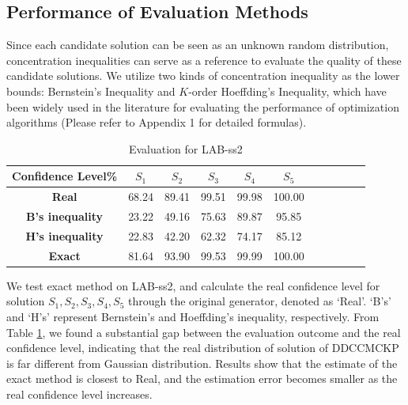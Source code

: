\documentclass[lettersize,journal]{IEEEtran}
\begin{document}
\subsection{Performance of Evaluation Methods}
Since each candidate solution can be seen as an unknown random distribution, concentration inequalities can serve as a reference to evaluate the quality of these candidate solutions. 
We utilize two kinds of concentration inequality as the lower bounds: Bernstein's Inequality and  $K$-order Hoeffding's Inequality, which have been widely used in the literature for evaluating the performance of optimization algorithms (Please refer to Appendix 1 for detailed formulas). 

\begin{table}[!t]
\caption{Evaluation for LAB-ss2}
\centering
\begin{tabular}{ccccccccccc}
\toprule
{\bfseries Confidence Level\%} & $S_1$ & $S_2$ & $S_3$ & $S_4$ & $S_5$\\
\midrule
{\bfseries Real} &68.24&89.41 &99.51 &99.98&100.00 \\
{\bfseries B's inequality} &23.22 &49.16 &75.63 &89.87 &95.85 \\
{\bfseries H's inequality} &22.83 &42.20 &62.32 &74.17 &85.12 \\
{\bfseries Exact} &81.64 &93.90 &99.53 &99.99 &100.00 \\
\bottomrule
\end{tabular}
\label{pef_eval_small}
\end{table}

We test exact method on LAB-ss2, and calculate the real confidence level for solution $S_1, S_2, S_3, S_4, S_5$ through the original generator, denoted as `Real'. 
`B's' and `H's' represent Bernstein's and Hoeffding's inequality, respectively. 
From Table \ref{pef_eval_small}, we found a substantial gap between the evaluation outcome and the real confidence level, indicating that the real distribution of solution of DDCCMCKP is far different from Gaussian distribution. 
Results show that the estimate of the exact method is closest to Real, and the estimation error becomes smaller as the real confidence level increases.
\end{document}

